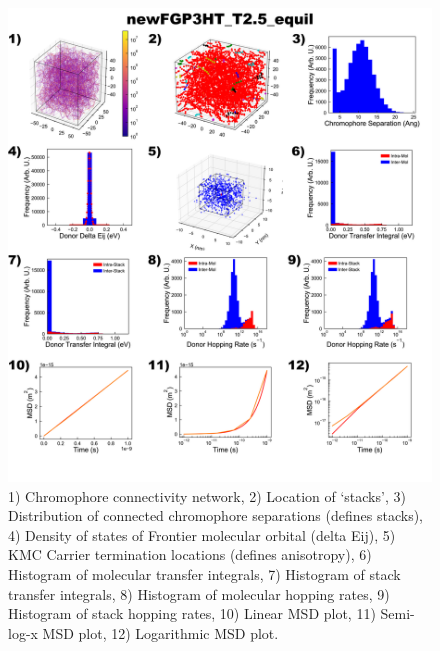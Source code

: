 \documentclass[12pt]{article}
\begin{document}
\begin{figure}[h]\centering
	\includegraphics[width=\textwidth]{Figures/newFGP3HT_T2.5_equil.png}
    \caption{   1) Chromophore connectivity network, 
                2) Location of `stacks', 
                3) Distribution of connected chromophore separations (defines stacks),
                4) Density of states of Frontier molecular orbital (delta Eij),
                5) KMC Carrier termination locations (defines anisotropy),
                6) Histogram of molecular transfer integrals,
                7) Histogram of stack transfer integrals,
                8) Histogram of molecular hopping rates,
                9) Histogram of stack hopping rates,
                10) Linear MSD plot,
                11) Semi-log-x MSD plot,
                12) Logarithmic MSD plot.}
	\label{fig:EqlT2.5}
\end{figure}




\end{document}
